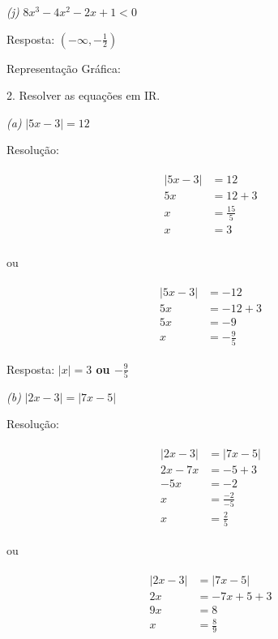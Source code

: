 \documentclass[12 pt, openright, twoside, a4paper, english, french, spanish, brazil]{abntex2}
\newcommand\bolden[1]{{\boldmath\bfseries#1}}
\begin{document}
\bigskip


\textit{(j)} $8x^3 - 4x^2 - 2x + 1 < 0$

Resposta: \bolden{$(-\infty,-\frac{1}{2})$}

Representação Gráfica:

\bigskip


2. Resolver as equações em I\!R.

\textit{(a)} $|5x - 3| = 12$

Resolução:

\begin{align*}
\begin{split}
|5x -3| &= 12 \\
5x &= 12 + 3 \\
x &= \frac{15}{5} \\
x &= 3 \\
\end{split}
\end{align*}
\begin{center}
ou
\end{center}
\begin{align*}
\begin{split}
|5x - 3| &= -12 \\
5x &= -12 + 3 \\
5x &= -9 \\
x &= -\frac{9}{5}
\end{split}
\end{align*}

Resposta: \bolden{$|x| = 3$ ou $-\frac{9}{5}$}


\bigskip


\textit{(b)} $|2x - 3| = |7x - 5|$

Resolução:

\begin{align*}
\begin{split}
|2x -3| &= |7x -5| \\
2x - 7x &= -5 + 3 \\
-5x &= -2 \\
x &= \frac{-2}{-5} \\
x &= \frac{2}{5}
\end{split}
\end{align*}
\begin{center}
ou
\end{center}
\begin{align*}
\begin{split}
|2x -3| &= |7x -5| \\
2x &= -7x + 5 + 3 \\
9x &= 8 \\
x &= \frac{8}{9}
\end{split}
\end{align*}
\end{document}

